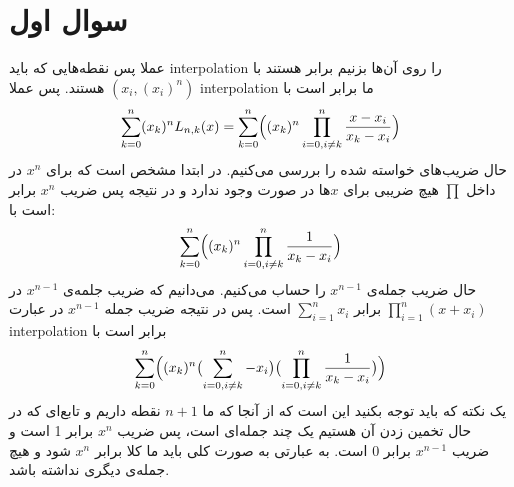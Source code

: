 \documentclass[]{article}
\begin{document}
\printheader

\section*{سوال اول}
عملا پس نقطه‌هایی که باید
interpolation
را روی آن‌ها بزنیم برابر هستند با
$\left(x_i, \left(x_i\right)^n\right)$
هستند. پس عملا
interpolation
ما برابر است با
\begin{gather*}
    \sum_{k=0}^{n} (x_k)^n L_{n, k} (x) = \sum_{k=0}^{n} \Bigl((x_k)^n \prod_{i=0, i \neq k}^{n} \frac{x - x_i}{x_k - x_i}\Bigr)
\end{gather*}
حال ضریب‌های خواسته شده را بررسی می‌کنیم. در ابتدا مشخص است که برای
$x^n$
در داخل
$\prod$
هیچ ضریبی برای
$x$ها
در صورت وجود ندارد و در نتیجه پس ضریب
$x^n$
برابر است با:
\begin{gather*}
    \sum_{k=0}^{n} \Bigl( (x_k)^n \prod_{i=0, i \neq k}^{n} \frac{1}{x_k - x_i} \Bigr)
\end{gather*}
حال ضریب جمله‌ی
$x^{n-1}$
را حساب می‌کنیم. می‌دانیم که ضریب جلمه‌ی
$x^{n-1}$
در
$\prod_{i=1}^n (x + x_i)$
برابر
$\sum_{i=1}^n x_i$
است. پس در نتیجه ضریب جمله
$x^{n-1}$
در عبارت
interpolation
برابر است با
\begin{gather*}
    \sum_{k=0}^{n} \Bigl((x_k)^n \bigl( \sum_{i=0, i \neq k}^{n} -x_i  \bigr) \bigl( \prod_{i=0, i \neq k}^{n} \frac{1}{x_k - x_i} \bigr) \Bigr)
\end{gather*}
یک نکته که باید توجه بکنید این است که از آنجا که ما
$n+1$
نقطه داریم و تابع‌ای که در حال تخمین زدن آن هستیم یک چند جمله‌ای است، پس ضریب
$x^n$
برابر 1 است و ضریب
$x^{n-1}$
برابر 0 است. به عبارتی به صورت کلی باید
ما کلا برابر
$x^n$
شود و هیچ جمله‌ی دیگری نداشته باشد.
\end{document}
